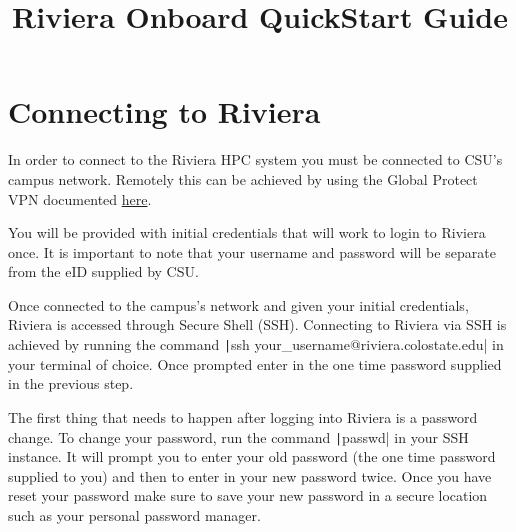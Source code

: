 \documentclass[11pt,letterpaper]{article}
\title{Riviera Onboard QuickStart Guide}
\begin{document}
\startdoc

\section{Connecting to Riviera}

\begin{description}[noitemsep]
    \item[Global Protect VPN] In order to connect to the Riviera HPC system you must be connected to CSU's campus network. Remotely this can be achieved by using the Global Protect VPN documented \href{https://csusystem.freshservice.com/support/solutions/folders/23000047198}{here}.
    \item[Initial Credentials] You will be provided with initial credentials that will work to login to Riviera once. It is important to note that your username and password will be separate from the eID supplied by CSU.
    \item[Secure Shell] Once connected to the campus's network and given your initial credentials, Riviera is accessed through Secure Shell (SSH). Connecting to Riviera via SSH is achieved by running the command \texttt|ssh your_username@riviera.colostate.edu| in your terminal of choice. Once prompted enter in the one time password supplied in the previous step.
    \item[Password Change] The first thing that needs to happen after logging into Riviera is a password change. To change your password, run the command \texttt|passwd| in your SSH instance. It will prompt you to enter your old password (the one time password supplied to you) and then to enter in your new password twice. Once you have reset your password make sure to save your new password in a secure location such as your personal password manager.
\end{description}
\end{document}
